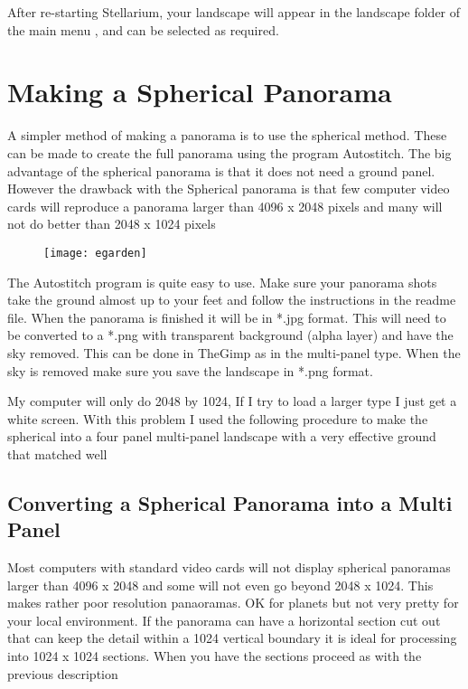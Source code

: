 After re-starting Stellarium, your landscape will appear in the
landscape folder of the main menu , and can be selected as required.

\section{Making a Spherical Panorama}
\label{making-a-spherical-panorama}

A simpler method of making a panorama is to use the spherical method.
These can be made to create the full panorama using the program
Autostitch. The big advantage of the spherical panorama is that it does
not need a ground panel. However the drawback with the Spherical
panorama is that few computer video cards will reproduce a panorama
larger than 4096 x 2048 pixels and many will not do better than 2048 x
1024 pixels

\begin{figure}[h]
\centering\texttt{[image: egarden]}
\end{figure}

The Autostitch program is quite easy to use. Make sure your panorama
shots take the ground almost up to your feet and follow the instructions
in the readme file. When the
panorama is finished it will be in *.jpg format. This will need to be
converted to a *.png with transparent background (alpha layer) and have
the sky removed. This can be done in TheGimp as in the multi-panel type.
When the sky is removed make sure you save the landscape in *.png
format.

My computer will only do 2048 by 1024, If I try to load a larger type I
just get a white screen. With this problem I used the following
procedure to make the spherical into a four panel multi-panel landscape
with a very effective ground that matched well

\subsection{Converting a Spherical Panorama into a Multi Panel}
\label{converting-a-spherical-panorama-into-a-multi-panel}

Most computers with standard video cards will not display spherical
panoramas larger than 4096 x 2048 and some will not even go beyond 2048
x 1024. This makes rather poor resolution panaoramas. OK for planets but
not very pretty for your local environment. If the panorama can have a
horizontal section cut out that can keep the detail within a 1024
vertical boundary it is ideal for processing into 1024 x 1024 sections.
When you have the sections proceed as with the previous description

